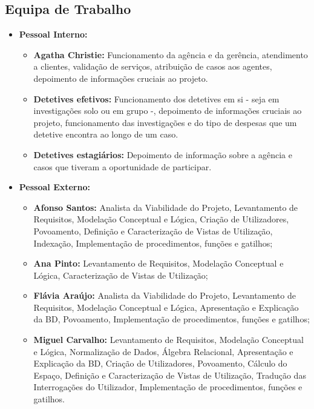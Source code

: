 \documentclass[a4paper,12pt]{scrreprt}
\begin{document}
        \clearpage
        
        \subsection{Equipa de Trabalho}
            \begin{itemize}
                \item \textbf{Pessoal Interno:}
                \begin{itemize}
                    \item \textbf{Agatha Christie:} Funcionamento da agência e da gerência, atendimento a clientes,
                    validação de serviços, atribuição de casos aos agentes, depoimento de informações
                    cruciais ao projeto.
                    \item\textbf{Detetives efetivos:} Funcionamento dos detetives em si - seja em investigações solo ou em grupo -, depoimento de informações cruciais ao projeto, funcionamento das investigações e do tipo de despesas que um detetive encontra ao longo de um caso. 
                    \item\textbf{Detetives estagiários:} Depoimento de informação sobre a agência e casos que tiveram a oportunidade de participar.
                \end{itemize}
            \item \textbf{Pessoal Externo:}
                \begin{itemize}
                    \item \textbf{Afonso Santos:} Analista da Viabilidade do Projeto, Levantamento de Requisitos, Modelação Conceptual e Lógica, Criação de Utilizadores, Povoamento, Definição e Caracterização de Vistas de Utilização, Indexação, Implementação de procedimentos, funções e gatilhos;
                    \item \textbf{Ana Pinto:} Levantamento de Requisitos, Modelação Conceptual e Lógica, Caracterização de Vistas de Utilização;
                    \item \textbf{Flávia Araújo:} Analista da Viabilidade do Projeto, Levantamento de Requisitos, Modelação Conceptual e Lógica, Apresentação e Explicação da BD, Povoamento, Implementação de procedimentos, funções e gatilhos;
                    \item \textbf{Miguel Carvalho:} Levantamento de Requisitos, Modelação Conceptual e Lógica, Normalização de Dados, Álgebra Relacional, Apresentação e Explicação da BD, Criação de Utilizadores, Povoamento, Cálculo do Espaço, Definição e Caracterização de Vistas de Utilização, Tradução das Interrogações do Utilizador, Implementação de procedimentos, funções e gatilhos.
                \end{itemize}
            \end{itemize}
\end{document}

